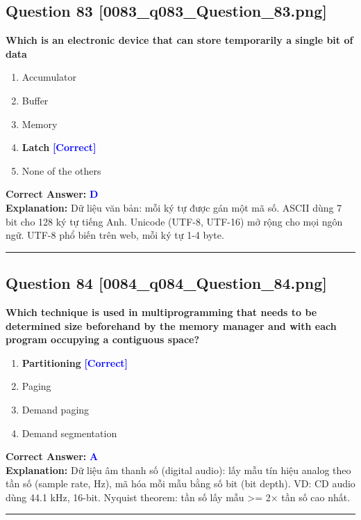 \documentclass[11pt,a4paper]{article}
\begin{document}
\begin{minipage}{\textwidth}
\subsection*{Question 83 \quad \footnotesize{[0083\_q083\_Question\_83.png]}}
\noindent \textbf{Which is an electronic device that can store temporarily a single bit of data}

\begin{enumerate}[label=\Alph*.]
    \item Accumulator
    \item Buffer
    \item Memory
    \item \textbf{Latch} \hfill \textcolor{blue}{\textbf{[Correct]}}
    \item None of the others
\end{enumerate}

\noindent \textbf{Correct Answer:} \textcolor{blue}{\textbf{D}} \\[2pt]
\noindent \textbf{Explanation:} Dữ liệu văn bản: mỗi ký tự được gán một mã số. ASCII dùng 7 bit cho 128 ký tự tiếng Anh. Unicode (UTF-8, UTF-16) mở rộng cho mọi ngôn ngữ. UTF-8 phổ biến trên web, mỗi ký tự 1-4 byte.

\par\vspace{0.3cm}
\hrule
\vspace{0.3cm}
\end{minipage}

\begin{minipage}{\textwidth}
\subsection*{Question 84 \quad \footnotesize{[0084\_q084\_Question\_84.png]}}
\noindent \textbf{Which technique is used in multiprogramming that needs to be determined size beforehand by the memory manager and with each program occupying a contiguous space?}

\begin{enumerate}[label=\Alph*.]
    \item \textbf{Partitioning} \hfill \textcolor{blue}{\textbf{[Correct]}}
    \item Paging
    \item Demand paging
    \item Demand segmentation
\end{enumerate}

\noindent \textbf{Correct Answer:} \textcolor{blue}{\textbf{A}} \\[2pt]
\noindent \textbf{Explanation:} Dữ liệu âm thanh số (digital audio): lấy mẫu tín hiệu analog theo tần số (sample rate, Hz), mã hóa mỗi mẫu bằng số bit (bit depth). VD: CD audio dùng 44.1 kHz, 16-bit. Nyquist theorem: tần số lấy mẫu >= 2× tần số cao nhất.

\par\vspace{0.3cm}
\hrule
\vspace{0.3cm}
\end{minipage}
\end{document}
